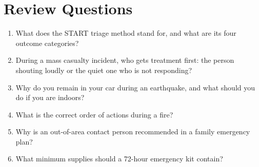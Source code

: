 \section{Review Questions}

\begin{enumerate}[leftmargin=*]
\item What does the START triage method stand for, and what are its four outcome categories?
\item During a mass casualty incident, who gets treatment first: the person shouting loudly or the quiet one who is not responding?
\item Why do you remain in your car during an earthquake, and what should you do if you are indoors?
\item What is the correct order of actions during a fire?
\item Why is an out-of-area contact person recommended in a family emergency plan?
\item What minimum supplies should a 72-hour emergency kit contain?
\end{enumerate}

